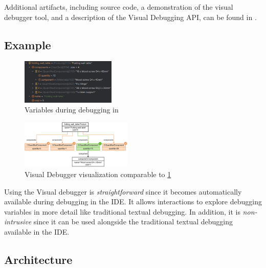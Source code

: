 \documentclass[sigconf]{acmart}
\begin{document}
Additional artifacts, including source code, a demonstration of the visual debugger tool, and a description of the Visual Debugging API, can be found in \cite{timkrauterICSE2024Artifacts2023}.

\subsection{Example}

\begin{figure}[h]
    \centering
    \includegraphics[width=0.4\textwidth]{images/variables.png}
    \caption{Variables during debugging in \intellij}
    \label{fig:variablesIntellij}
\end{figure}

\begin{figure}[h]
    \centering
    \includegraphics[width=0.475\textwidth]{images/variables-visual-debugger.png}
    \caption{Visual Debugger visualization comparable to \cref{fig:variablesIntellij}}
    \label{fig:visualDebuggerVariables}
\end{figure}


Using the Visual debugger is \textit{straightforward} since it becomes automatically available during debugging in the IDE.
It allows interactions to explore debugging variables in more detail like traditional textual debugging.
In addition, it is \textit{non-intrusive} since it can be used alongside the traditional textual debugging available in the IDE.


\subsection{Architecture}
\end{document}

